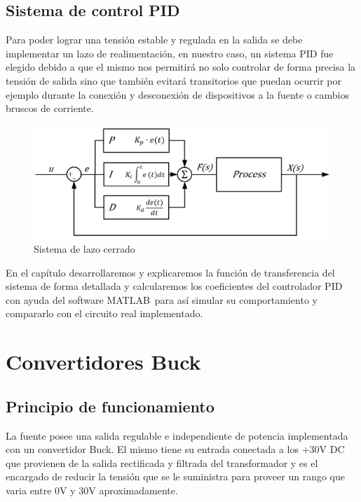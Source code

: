 \documentclass[12pt]{report}
\begin{document}
\section{Sistema de control PID}

Para poder lograr una tensión estable y regulada en la salida se debe implementar un lazo de realimentación, en nuestro caso, un sistema PID fue elegido debido a que el mismo nos permitirá no solo controlar de forma precisa la tensión de salida sino que también evitará transitorios que puedan ocurrir por ejemplo durante la conexión y desconexión de dispositivos a la fuente o cambios bruscos de corriente.

\begin{figure}[H]
	\centering
	\includegraphics[width=\textwidth,height=\textheight,keepaspectratio]{closed_loop}
	\caption{Sistema de lazo cerrado}
\end{figure}

En el capítulo \textit{} desarrollaremos y explicaremos la función de transferencia del sistema de forma detallada y calcularemos los coeficientes del controlador PID con ayuda del software MATLAB\textregistered \ para así simular su comportamiento y compararlo con el circuito real implementado.

\chapter{Convertidores Buck}

\section{Principio de funcionamiento}

	La fuente posee una salida regulable e independiente de potencia implementada con un convertidor Buck. El mismo tiene su entrada conectada a los +30V DC que provienen de la salida rectificada y filtrada del transformador y es el encargado de reducir la tensión que se le suministra para proveer un rango que varia entre 0V y 30V aproximadamente. 
	
\end{document}
